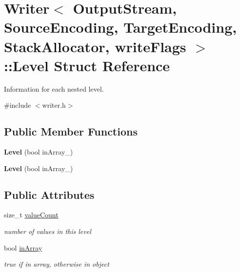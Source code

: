 \hypertarget{struct_writer_1_1_level}{}\section{Writer$<$ Output\+Stream, Source\+Encoding, Target\+Encoding, Stack\+Allocator, write\+Flags $>$\+:\+:Level Struct Reference}
\label{struct_writer_1_1_level}


Information for each nested level.  




{\ttfamily \#include $<$writer.\+h$>$}

\subsection*{Public Member Functions}
\begin{DoxyCompactItemize}
\item 
{\bfseries Level} (bool in\+Array\+\_\+)\hypertarget{struct_writer_1_1_level_a0b1844a7a1b7c6c20e1964dbb67da484}{}\label{struct_writer_1_1_level_a0b1844a7a1b7c6c20e1964dbb67da484}

\item 
{\bfseries Level} (bool in\+Array\+\_\+)\hypertarget{struct_writer_1_1_level_a0b1844a7a1b7c6c20e1964dbb67da484}{}\label{struct_writer_1_1_level_a0b1844a7a1b7c6c20e1964dbb67da484}

\end{DoxyCompactItemize}
\subsection*{Public Attributes}
\begin{DoxyCompactItemize}
\item 
size\+\_\+t \hyperlink{struct_writer_1_1_level_a4a09e5fda49d0d57b2adc041203f244f}{value\+Count}\hypertarget{struct_writer_1_1_level_a4a09e5fda49d0d57b2adc041203f244f}{}\label{struct_writer_1_1_level_a4a09e5fda49d0d57b2adc041203f244f}

\begin{DoxyCompactList}\small\item\em number of values in this level \end{DoxyCompactList}\item 
bool \hyperlink{struct_writer_1_1_level_aa009a2d675e98757c2997072aad78789}{in\+Array}\hypertarget{struct_writer_1_1_level_aa009a2d675e98757c2997072aad78789}{}\label{struct_writer_1_1_level_aa009a2d675e98757c2997072aad78789}

\begin{DoxyCompactList}\small\item\em true if in array, otherwise in object \end{DoxyCompactList}\end{DoxyCompactItemize}


